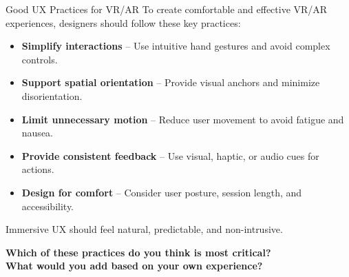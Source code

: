 \documentclass[aspectratio=169, table]{beamer}
\begin{document}
\begin{frame}{Good UX Practices for VR/AR}
	\vspace{20pt}
	To create comfortable and effective VR/AR experiences, designers should follow these key practices:
	
	\vspace{5pt}
	\begin{itemize}
		\item \textbf{Simplify interactions} – Use intuitive hand gestures and avoid complex controls.
		\item \textbf{Support spatial orientation} – Provide visual anchors and minimize disorientation.
		\item \textbf{Limit unnecessary motion} – Reduce user movement to avoid fatigue and nausea.
		\item \textbf{Provide consistent feedback} – Use visual, haptic, or audio cues for actions.
		\item \textbf{Design for comfort} – Consider user posture, session length, and accessibility.
	\end{itemize}
	
	\vspace{5pt}
	Immersive UX should feel natural, predictable, and non-intrusive.
	
	\vspace{5pt}
	\centering
	\large
	\textbf{Which of these practices do you think is most critical?\\What would you add based on your own experience?}
\end{frame}
\end{document}
